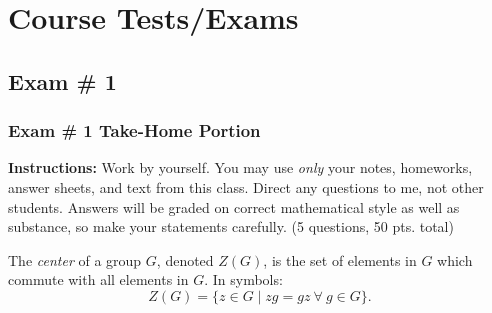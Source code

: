 \setcounter{chapter}{4}
\chapter*{Course Tests/Exams}
\addtocounter{chapter}{1} %
\setcounter{section}{0}

\section{Exam \# 1 }
\subsection{Exam \# 1 Take-Home Portion}
\noindent\textbf{Instructions:} Work by yourself. You may use \textit{only} your notes, homeworks, answer sheets, and text from this class. Direct any questions to me, not other students. Answers will be graded on correct mathematical style as well as substance, so make your statements carefully. (5 questions, 50 pts. total)

\begin{definition}
The \textit{center} of a group \( G \), denoted \( Z(G) \), is the set of elements in \( G \) which commute with all elements in \( G \). In symbols:
\[
Z(G) = \{ z \in G \mid zg = gz \ \forall \ g \in G \}.
\]
\end{definition}


